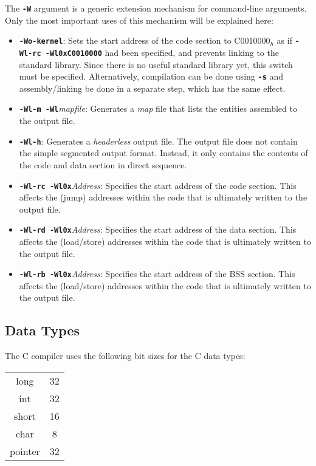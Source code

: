 The {\tt \bf -W} argument is a generic extension mechanism for command-line arguments. Only the most important uses of this mechanism will be explained here:
\begin{itemize}
\item {\tt \bf -Wo-kernel}: Sets the start address of the code section to C0010000$_h$ as if {\tt \bf -Wl-rc -Wl0xC0010000} had been specified, and prevents linking to the standard library. Since there is no useful standard library yet, this switch must be specified. Alternatively, compilation can be done using {\tt \bf -s} and assembly/linking be done in a separate step, which has the same effect.
\item {\tt \bf -Wl-m -Wl}{\it mapfile}: Generates a {\it map} file that lists the entities assembled to the output file.
\item {\tt \bf -Wl-h}: Generates a {\it headerless} output file. The output file does not contain the simple segmented output format. Instead, it only contains the contents of the code and data section in direct sequence.
\item {\tt \bf -Wl-rc -Wl0x}{\it Address}: Specifies the start address of the code section. This affects the (jump) addresses within the code that is ultimately written to the output file.
\item {\tt \bf -Wl-rd -Wl0x}{\it Address}: Specifies the start address of the data section. This affects the (load/store) addresses within the code that is ultimately written to the output file.
\item {\tt \bf -Wl-rb -Wl0x}{\it Address}: Specifies the start address of the BSS section. This affects the (load/store) addresses within the code that is ultimately written to the output file.
\end{itemize}

\subsection{Data Types}

The C compiler uses the following bit sizes for the C data types:

\begin{tabular}{|c|c|}
\hline
long & 32\\
int & 32\\
short & 16\\
char & 8\\
pointer & 32\\
\hline
\end{tabular}

